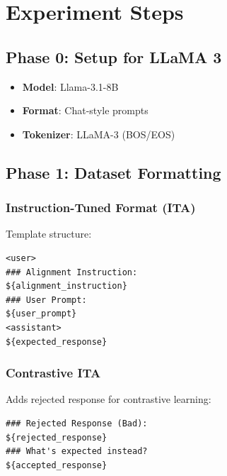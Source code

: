 
\label{sec:methodology}

\section{Experiment Steps}

\subsection{Phase 0: Setup for LLaMA 3}

\begin{itemize}
    \item \textbf{Model}: Llama-3.1-8B
    \item \textbf{Format}: Chat-style prompts
    \item \textbf{Tokenizer}: LLaMA-3 (BOS/EOS)
\end{itemize}

\subsection{Phase 1: Dataset Formatting}

\subsubsection{Instruction-Tuned Format (ITA)}

Template structure:
\begin{small}
\begin{verbatim}
<user>
### Alignment Instruction:
${alignment_instruction}
### User Prompt:
${user_prompt}
<assistant>
${expected_response}
\end{verbatim}
\end{small}

\subsubsection{Contrastive ITA}

Adds rejected response for contrastive learning:
\begin{small}
\begin{verbatim}
### Rejected Response (Bad):
${rejected_response}
### What's expected instead?
${accepted_response}
\end{verbatim}
\end{small}

